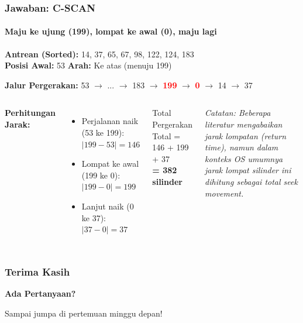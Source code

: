 \documentclass[t,aspectratio=169,xcolor=dvipsnames]{beamer}
\newcommand{\tem}[1]{\textbf{\textcolor{red}{#1}}}
\begin{document}
\begin{frame}
    \frametitle{Jawaban: C-SCAN}
    \framesubtitle{Maju ke ujung (199), lompat ke awal (0), maju lagi}
    \small
    \textbf{Antrean (Sorted):} 14, 37, 65, 67, 98, 122, 124, 183\\
    \textbf{Posisi Awal:} 53 \quad \textbf{Arah:} Ke atas (menuju 199)
    
    \vspace{0.3cm}
    \textbf{Jalur Pergerakan:}
    53 $\rightarrow$ ... $\rightarrow$ 183 $\rightarrow$ \tem{199} $\rightarrow$ \tem{0} $\rightarrow$ 14 $\rightarrow$ 37
    
    \vspace{0.3cm}
    \begin{columns}[T]
        \textbf{Perhitungan Jarak:}
        \begin{itemize}
            \item Perjalanan naik (53 ke 199):\\
                  $|199 - 53| = 146$
            \item Lompat ke awal (199 ke 0):\\
                  $|199 - 0| = 199$
            \item Lanjut naik (0 ke 37):\\
                  $|37 - 0| = 37$
        \end{itemize}
        
        \begin{exampleblock}{Total Pergerakan}
            Total = 146 + 199 + 37\\
            \textbf{= 382 silinder}
        \end{exampleblock}
        \vspace{0.2cm}
        \scriptsize \textit{Catatan: Beberapa literatur mengabaikan jarak lompatan (return time), namun dalam konteks OS umumnya jarak lompat silinder ini dihitung sebagai total seek movement.}
    \end{columns}
\end{frame}

\begin{frame}
    \frametitle{Terima Kasih}
    \begin{center}
        \Huge \textbf{Ada Pertanyaan?}

        \vspace{0.8cm}
        \normalsize
        Sampai jumpa di pertemuan minggu depan!
    \end{center}
\end{frame}
\end{document}
